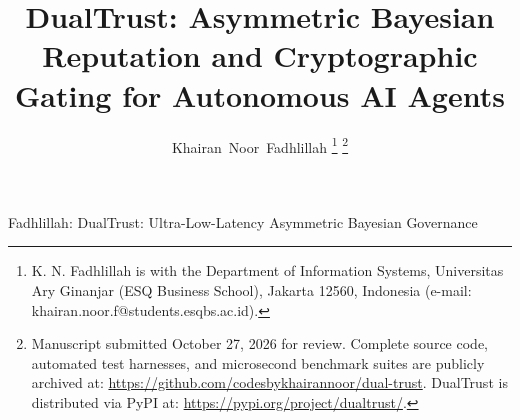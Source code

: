 \documentclass[journal]{IEEEtran}
\begin{document}
\flushbottom

\title{DualTrust: Asymmetric Bayesian Reputation and Cryptographic Gating for Autonomous AI Agents}

\author{Khairan~Noor~Fadhlillah%
\thanks{K. N. Fadhlillah is with the Department of Information Systems, Universitas Ary Ginanjar (ESQ Business School), Jakarta 12560, Indonesia (e-mail: khairan.noor.f@students.esqbs.ac.id).}%
\thanks{Manuscript submitted October 27, 2026 for review. Complete source code, automated test harnesses, and microsecond benchmark suites are publicly archived at: \url{https://github.com/codesbykhairannoor/dual-trust}. DualTrust is distributed via PyPI at: \url{https://pypi.org/project/dualtrust/}.}%
}

%
{Fadhlillah: DualTrust: Ultra-Low-Latency Asymmetric Bayesian Governance}

\maketitle
\end{document}
